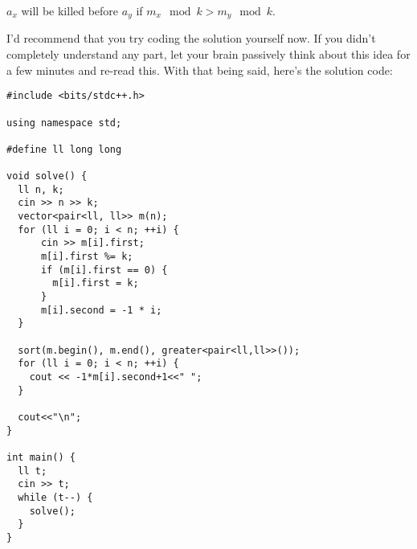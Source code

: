 \documentclass{article}
\begin{document}
$a_x$ will be killed before $a_y$ if $m_x \mod k > m_y \mod k$.

I'd recommend that you try coding the solution yourself now. If you didn't completely understand any part, let your brain passively think about this idea for a few minutes and re-read this. With that being said, here's the solution code:

\begin{verbatim}
#include <bits/stdc++.h>
 
using namespace std;
 
#define ll long long
 
void solve() {
  ll n, k;
  cin >> n >> k;
  vector<pair<ll, ll>> m(n);
  for (ll i = 0; i < n; ++i) {
      cin >> m[i].first;
      m[i].first %= k;
      if (m[i].first == 0) {
        m[i].first = k;
      }
      m[i].second = -1 * i;
  }
 
  sort(m.begin(), m.end(), greater<pair<ll,ll>>());
  for (ll i = 0; i < n; ++i) {
    cout << -1*m[i].second+1<<" ";
  }
 
  cout<<"\n";
}
 
int main() {
  ll t;
  cin >> t;
  while (t--) {
    solve();
  }
}
\end{verbatim}
\end{document}
